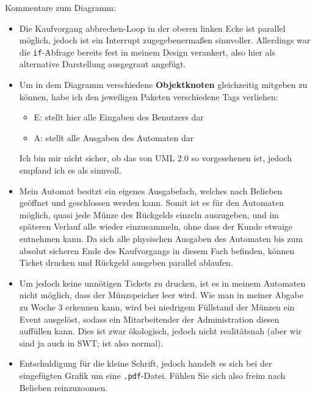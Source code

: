 \documentclass{article}
\newcommand{\gqq}[1]{\glqq{}#1\grqq{}}
\begin{document}
\begin{enumerate}[label=\alph*.]
            Kommentare zum Diagramm:
            \begin{itemize}
                \item Die \gqq{Kaufvorgang abbrechen}-Loop in der oberen linken Ecke ist parallel möglich, jedoch ist ein Interrupt zugegebenermaßen sinnvoller.
                    Allerdings war die \texttt{if}-Abfrage bereits fest in meinem Design verankert, also hier als alternative Darstellung ausgegraut angefügt.
                \item Um in dem Diagramm verschiedene \textbf{Objektknoten} gleichzeitig mitgeben zu können, habe ich den jeweiligen Paketen verschiedene Tags verliehen:
                    \begin{itemize}
                        \item E: stellt hier alle Eingaben des Benutzers dar
                        \item A: stellt alle Ausgaben des Automaten dar
                    \end{itemize}
                    Ich bin mir nicht sicher, ob das von UML 2.0 so vorgesehenen ist, jedoch empfand ich es als sinnvoll.
                \item Mein Automat besitzt ein eigenes Ausgabefach, welches nach Belieben geöffnet und geschlossen werden kann.
                    Somit ist es für den Automaten möglich, quasi jede Münze des Rückgelds einzeln auszugeben, und im späteren Verlauf alle wieder einzusammeln, ohne dass der Kunde etwaige entnehmen kann.
                    Da sich alle physischen Ausgaben des Automaten bis zum absolut sicheren Ende des Kaufvorgangs in diesem Fach befinden, können \gqq{Ticket drucken} und \gqq{Rückgeld ausgeben} parallel ablaufen.
                \item Um jedoch keine unnötigen Tickets zu drucken, ist es in meinem Automaten nicht möglich, dass der Münzspeicher leer wird.
                    Wie man in meiner Abgabe zu Woche 3 erkennen kann, wird bei niedrigem Füllstand der Münzen ein Event ausgelöst, sodass ein Mitarbeitender der Administration diesen auffüllen kann.
                    Dies ist zwar ökologisch, jedoch nicht realitätsnah (aber wir sind ja auch in SWT; ist also normal).
                \item Entschuldigung für die kleine Schrift, jedoch handelt es sich bei der eingefügten Grafik um eine \texttt{.pdf}-Datei.
                    Fühlen Sie sich also freim nach Belieben reinzuzoomen.
            \end{itemize}


\end{enumerate}
\end{document}
